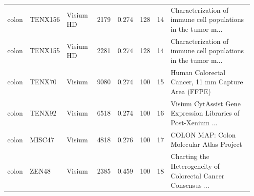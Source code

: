 \begin{tabular}{lllrrrrl}
colon & TENX156 & Visium HD & 2179 & 0.274 & 128 & 14 & Characterization of immune cell populations in the tumor m... \\
colon & TENX155 & Visium HD & 2281 & 0.274 & 128 & 14 & Characterization of immune cell populations in the tumor m... \\
colon & TENX70 & Visium & 9080 & 0.274 & 100 & 15 & Human Colorectal Cancer, 11 mm Capture Area (FFPE) \\
colon & TENX92 & Visium & 6518 & 0.274 & 100 & 16 & Visium CytAssist Gene Expression Libraries of Post-Xenium ... \\
colon & MISC47 & Visium & 4818 & 0.276 & 100 & 17 & COLON MAP: Colon Molecular Atlas Project \\
colon & ZEN48 & Visium & 2385 & 0.459 & 100 & 18 & Charting the Heterogeneity of Colorectal Cancer Consensus ... \\
\bottomrule
\end{tabular}